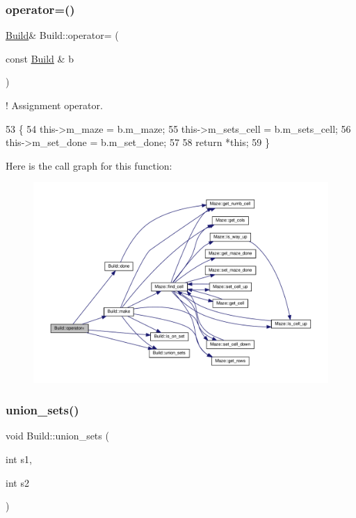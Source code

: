\subsubsection{\texorpdfstring{operator=()}{operator=()}}
{\footnotesize\ttfamily \hyperlink{classBuild}{Build}\& Build\+::operator= (\begin{DoxyParamCaption}\item[{const \hyperlink{classBuild}{Build} \&}]{b }\end{DoxyParamCaption})\hspace{0.3cm}{\ttfamily [inline]}}



! Assignment operator. 


\begin{DoxyCode}
53         \{
54             this->m\_maze = b.m\_maze;
55             this->m\_sets\_cell = b.m\_sets\_cell;
56             this->m\_set\_done = b.m\_set\_done;
57 
58             \textcolor{keywordflow}{return} *\textcolor{keyword}{this};
59         \}
\end{DoxyCode}
Here is the call graph for this function\+:\nopagebreak
\begin{figure}[H]
\begin{center}
\leavevmode
\includegraphics[width=350pt]{classBuild_a72dbb04928303d0b90d003cb90d85550_cgraph}
\end{center}
\end{figure}
\mbox{\label{classBuild_af1582ef11fb92698ba75581f2f7ead02}} 
\subsubsection{\texorpdfstring{union\+\_\+sets()}{union\_sets()}}
{\footnotesize\ttfamily void Build\+::union\+\_\+sets (\begin{DoxyParamCaption}\item[{int}]{s1,  }\item[{int}]{s2 }\end{DoxyParamCaption})}



